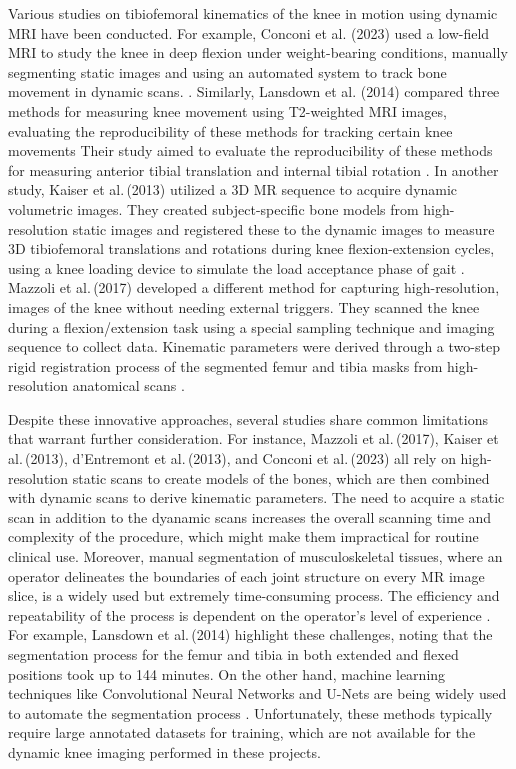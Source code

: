 \documentclass{micro-econ-thesis}
\begin{document}
Various studies on tibiofemoral kinematics of the knee in motion using dynamic MRI have been conducted.  For example, Conconi et al. (2023) used a low-field MRI to study the knee in deep flexion under weight-bearing conditions, manually segmenting static images and using an automated system to track bone movement in dynamic scans. \parencite{conconi_-vivo_2023}. Similarly, Lansdown et al. (2014) compared three methods for measuring knee movement using T2-weighted MRI images, evaluating the reproducibility of these methods for tracking certain knee movements Their study aimed to evaluate the reproducibility of these methods for measuring anterior tibial translation and internal tibial rotation \parencite{lansdown_reproducibility_2015}. In another study, Kaiser et al.\,(2013) utilized a 3D MR sequence to acquire dynamic volumetric images. They created subject-specific bone models from high-resolution static images and registered these to the dynamic images to measure 3D tibiofemoral translations and rotations during knee flexion-extension cycles, using a knee loading device to simulate the load acceptance phase of gait \parencite{kaiser_measurement_2013}. Mazzoli et al.\,(2017) developed a different method for capturing high-resolution, images of the knee without needing external triggers. They scanned the knee during a flexion/extension task using a special sampling technique and imaging sequence to collect data. Kinematic parameters were derived through a two-step rigid registration process of the segmented femur and tibia masks from high-resolution anatomical scans \parencite{mazzoli_accelerated_2017}.

Despite these innovative approaches, several studies share common limitations that warrant further consideration. For instance, Mazzoli et al.\,(2017), Kaiser et al.\,(2013), d'Entremont et al.\,(2013), and Conconi et al.\,(2023) all rely on high-resolution static scans to create models of the bones, which are then combined with dynamic scans to derive kinematic parameters. The need to acquire a static scan in addition to the dyanamic scans increases the overall scanning time and complexity of the procedure, which might make them impractical for routine clinical use. Moreover, manual segmentation of musculoskeletal tissues, where an operator delineates the boundaries of each joint structure on every MR image slice, is a widely used but extremely time-consuming process. The efficiency and repeatability of the process is dependent on the operator's level of experience \parencite{mcwalter_use_2005}. For example, Lansdown et al.\,(2014) highlight these challenges, noting that the segmentation process for the femur and tibia in both extended and flexed positions took up to 144 minutes. On the other hand, machine learning techniques like Convolutional Neural Networks and U-Nets are being widely used to automate the segmentation process \parencite{liu_deep_2018}. Unfortunately, these methods typically require large annotated datasets for training, which are not available for the dynamic knee imaging performed in these projects.
\end{document}
